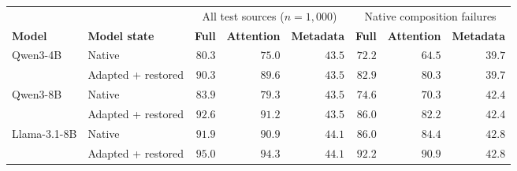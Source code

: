 \begingroup\renewcommand{\arraystretch}{1.08}
\begin{tabular}{llrrrrrr}
\toprule
 &  & \multicolumn{3}{c}{All test sources ($n=1{,}000$)} & \multicolumn{3}{c}{Native composition failures} \\
\cmidrule(lr){3-5}\cmidrule(lr){6-8}
\textbf{Model} & \textbf{Model state} & \textbf{Full} & \textbf{Attention} & \textbf{Metadata} & \textbf{Full} & \textbf{Attention} & \textbf{Metadata} \\
\midrule
\rowcolor{tablebase}Qwen3-4B & Native & $\mathbf{80.3}$ & $75.0$ & $43.5$ & $\mathbf{72.2}$ & $64.5$ & $39.7$ \\
\rowcolor{tableours} & Adapted + restored & $\mathbf{90.3}$ & $89.6$ & $43.5$ & $\mathbf{82.9}$ & $80.3$ & $39.7$ \\
\midrule
\rowcolor{tablebase}Qwen3-8B & Native & $\mathbf{83.9}$ & $79.3$ & $43.5$ & $\mathbf{74.6}$ & $70.3$ & $42.4$ \\
\rowcolor{tableours} & Adapted + restored & $\mathbf{92.6}$ & $91.2$ & $43.5$ & $\mathbf{86.0}$ & $82.2$ & $42.4$ \\
\midrule
\rowcolor{tablebase}Llama-3.1-8B & Native & $\mathbf{91.9}$ & $90.9$ & $44.1$ & $\mathbf{86.0}$ & $84.4$ & $42.8$ \\
\rowcolor{tableours} & Adapted + restored & $\mathbf{95.0}$ & $94.3$ & $44.1$ & $\mathbf{92.2}$ & $90.9$ & $42.8$ \\
\bottomrule
\end{tabular}
\endgroup
